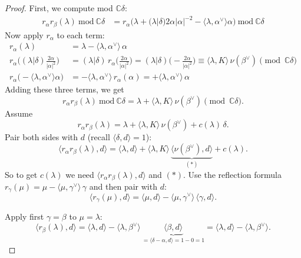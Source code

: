 \documentclass[12pt]{article}
\begin{document}
\begin{proof}
    First, we compute mod $\mathbb{C}\delta$:
    \[
        \begin{aligned}
            r_\alpha r_\beta(\lambda)\ \mathrm{mod}\ \mathbb{C}\delta
             & = r_\alpha\bigl(\lambda +  (\lambda|\delta) 2\alpha|\alpha|^{-2}
            - \langle \lambda, \alpha^\vee\rangle \alpha \bigr)\ \mathrm{mod}\ \mathbb{C}\delta
        \end{aligned}
    \]
    Now apply $r_\alpha$ to each term:
    \begin{align*}
        r_\alpha(\lambda)                                              & =\lambda-\langle\lambda,\alpha^\vee\rangle\,\alpha                 \\
        r_\alpha\!\big((\lambda|\delta)\frac{2\alpha}{|\alpha|^2}\big) & =(\lambda|\delta)\,r_\alpha\!\big(\tfrac{2\alpha}{|\alpha|^2}\big)
        =(\lambda|\delta)\Big(-\tfrac{2\alpha}{|\alpha|^2}\Big)
        \equiv \langle\lambda,K\rangle\,\nu(\beta^\vee)\pmod{\mathbb C\delta}                                                               \\
        r_\alpha\!\big(-\langle\lambda,\alpha^\vee\rangle\alpha\big)
                                                                       & =-\langle\lambda,\alpha^\vee\rangle\,r_\alpha(\alpha)
        =+\langle\lambda,\alpha^\vee\rangle\,\alpha
    \end{align*}
    Adding these three terms, we get
    \[
        r_\alpha r_\beta(\lambda)\ \mathrm{mod}\ \mathbb{C}\delta
        = \lambda + \langle\lambda,K\rangle\,\nu(\beta^\vee) \pmod{\mathbb{C}\delta}.
    \]
    Assume
    \[
        r_\alpha r_\beta(\lambda) = \lambda + \langle\lambda,K\rangle\,\nu(\beta^\vee) + c(\lambda)\,\delta.
    \]
    Pair both sides with $d$ (recall $\langle\delta,d\rangle=1$):
    \[
        \langle r_\alpha r_\beta(\lambda),d\rangle = \langle\lambda,d\rangle + \langle\lambda,K\rangle\,\underbrace{\langle\nu(\beta^\vee),d\rangle}_{(*)} + c(\lambda).
    \]
    So to get $c(\lambda)$ we need $\langle r_\alpha r_\beta(\lambda),d\rangle$ and $(*)$. Use the reflection formula $r_\gamma(\mu)=\mu-\langle\mu,\gamma^\vee\rangle\,\gamma$ and then pair with $d$:
    \[
        \langle r_\gamma(\mu),d\rangle = \langle\mu,d\rangle-\langle\mu,\gamma^\vee\rangle\,\langle\gamma,d\rangle.
    \]

    Apply first $\gamma=\beta$ to $\mu=\lambda$:
    \[
        \langle r_\beta(\lambda),d\rangle = \langle\lambda,d\rangle-\langle\lambda,\beta^\vee\rangle\,\underbrace{\langle\beta,d\rangle}_{=\langle\delta-\alpha,d\rangle=1-0=1} = \langle\lambda,d\rangle-\langle\lambda,\beta^\vee\rangle.
    \]


\end{proof}
\end{document}
